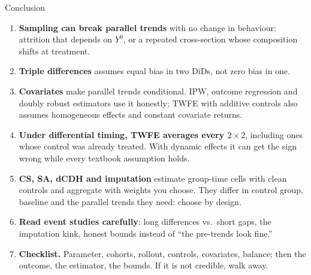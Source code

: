 \documentclass[
  11pt,
  ignorenonframetext,
  aspectratio=169,
]{beamer}
\providecommand{\tightlist}{%
  \setlength{\itemsep}{0pt}\setlength{\parskip}{0pt}}
\begin{document}
\begin{frame}{Conclusion}
\protect{}\label{conclusion}
\begin{enumerate}
\tightlist
\item
  \textbf{Sampling can break parallel trends} with no change in
  behaviour: attrition that depends on \(Y^0\), or a repeated
  cross-section whose composition shifts at treatment.
\item
  \textbf{Triple differences} assumes equal bias in two DiDs, not zero
  bias in one.
\item
  \textbf{Covariates} make parallel trends conditional. IPW, outcome
  regression and doubly robust estimators use it honestly; TWFE with
  additive controls also assumes homogeneous effects and constant
  covariate returns.
\item
  \textbf{Under differential timing, TWFE averages every
  \(2 \times 2\)}, including ones whose control was already treated.
  With dynamic effects it can get the sign wrong while every textbook
  assumption holds.
\item
  \textbf{CS, SA, dCDH and imputation} estimate group-time cells with
  clean controls and aggregate with weights you choose. They differ in
  control group, baseline and the parallel trends they need: choose by
  design.
\item
  \textbf{Read event studies carefully}: long differences vs.~short
  gaps, the imputation kink, honest bounds instead of ``the pre-trends
  look fine.''
\item
  \textbf{Checklist.} Parameter, cohorts, rollout, controls, covariates,
  balance; then the outcome, the estimator, the bounds. If it is not
  credible, walk away.
\end{enumerate}
\end{frame}
\end{document}
